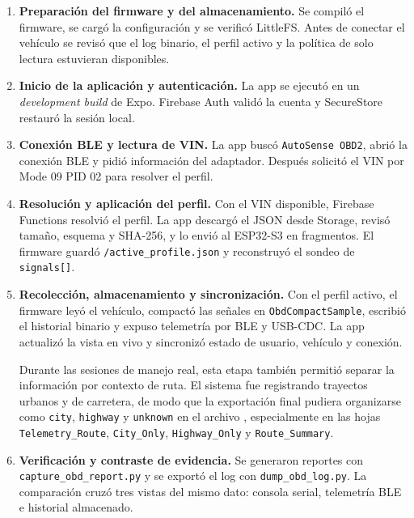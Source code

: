 \documentclass[12pt,letterpaper]{report}
\begin{document}
\begin{enumerate}
    \item \textbf{Preparación del firmware y del almacenamiento.} Se compiló el firmware, se cargó la configuración y se verificó LittleFS. Antes de conectar el vehículo se revisó que el log binario, el perfil activo y la política de solo lectura estuvieran disponibles.

    \item \textbf{Inicio de la aplicación y autenticación.} La app se ejecutó en un \textit{development build} de Expo. Firebase Auth validó la cuenta y SecureStore restauró la sesión local.

    \item \textbf{Conexión BLE y lectura de VIN.} La app buscó \texttt{AutoSense OBD2}, abrió la conexión BLE y pidió información del adaptador. Después solicitó el VIN por Mode 09 PID 02 para resolver el perfil.

    \item \textbf{Resolución y aplicación del perfil.} Con el VIN disponible, Firebase Functions resolvió el perfil. La app descargó el JSON desde Storage, revisó tamaño, esquema y SHA-256, y lo envió al ESP32-S3 en fragmentos. El firmware guardó \texttt{/active\_profile.json} y reconstruyó el sondeo de \texttt{signals[]}.

    \item \textbf{Recolección, almacenamiento y sincronización.} Con el perfil activo, el firmware leyó el vehículo, compactó las señales en \texttt{ObdCompactSample}, escribió el historial binario y expuso telemetría por BLE y USB-CDC. La app actualizó la vista en vivo y sincronizó estado de usuario, vehículo y conexión.
    
    Durante las sesiones de manejo real, esta etapa también permitió separar la información por contexto de ruta. El sistema fue registrando trayectos urbanos y de carretera, de modo que la exportación final pudiera organizarse como \texttt{city}, \texttt{highway} y \texttt{unknown} en el archivo , especialmente en las hojas \texttt{Telemetry\_Route}, \texttt{City\_Only}, \texttt{Highway\_Only} y \texttt{Route\_Summary}.

    \item \textbf{Verificación y contraste de evidencia.} Se generaron reportes con \texttt{capture\_obd\_report.py} y se exportó el log con \texttt{dump\_obd\_log.py}. La comparación cruzó tres vistas del mismo dato: consola serial, telemetría BLE e historial almacenado.
\end{enumerate}
\end{document}
